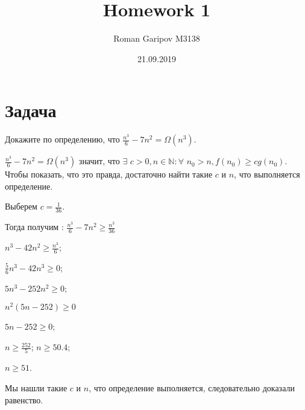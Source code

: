 \documentclass{article}
\title{Homework 1}
\date{21.09.2019}
\author{Roman Garipov M3138}
\begin{document}
  \maketitle
  \newpage

\section{Задача }
Докажите по определению, что 	$ \frac{n^{3}}{6} - 7n^{2} = \Omega(n^{3})$.
$$$$


   $ \frac{n^{3}}{6} - 7n^{2} = \Omega(n^{3})$ значит, что $ \exists $ $c > 0,  n \in \mathbb{N}: \forall$ $n_{0} > n, f(n_{0}) \geqslant cg(n_{0})$. 
   Чтобы показать, что это правда, достаточно найти такие $c$ и $n$, что выполняется определение. 
\begin{center}
	Выберем $c = \frac{1}{36}$. 
   
   Тогда получим : $ \frac{n^{3}}{6} - 7n^{2} \geqslant \frac{n^{3}}{36} $
   
    $n^{3} - 42n^{2} \geqslant \frac{n^{3}}{6}$; 
    
    $\frac{5}{6}n^{3} - 42n^{3} \geqslant 0$;
    
     $5n^{3} - 252n^{2} \geqslant 0$; 
     
      $n^{2}(5n - 252) \geqslant 0$ 
    
     $5n - 252 \geqslant 0$; 
     
     $n \geqslant \frac{252}{5}$; $ n \geqslant 50.4$; 
     
     $n \geqslant 51$.
\end{center}     
      Мы нашли такие $c$ и $n$, что определение выполняется, следовательно доказали равенство.
      
\end{document}
